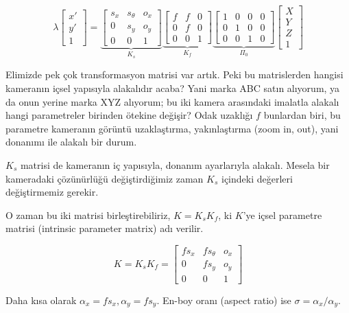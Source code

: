 \documentclass[12pt,fleqn]{article}\usepackage{../../common}
\begin{document}
$$ 
\lambda
\left[\begin{array}{c}
x' \\ y' \\ 1
\end{array}\right]
=
\underbrace{
\left[\begin{array}{rrr}
s_x & s_\theta & o_x \\
0 & s_y & o_y \\
0 & 0 & 1
\end{array}\right]
}_{K_s}
\underbrace{
\left[\begin{array}{rrr}
f & f & 0 \\
0 & f & 0 \\
0 & 0 & 1
\end{array}\right]}_{K_f}
\underbrace{
\left[\begin{array}{rrrr}
1 & 0 & 0 & 0\\
0 & 1 & 0 & 0\\
0 & 0 & 1 & 0
\end{array}\right]}_{\Pi_0}
\left[\begin{array}{r}
X \\ Y \\ Z \\ 1
\end{array}\right]
 $$

Elimizde pek çok transformasyon matrisi var artık. Peki bu matrislerden hangisi
kameranın içsel yapısıyla alakalıdır acaba? Yani marka ABC satın alıyorum, ya da
onun yerine marka XYZ alıyorum; bu iki kamera arasındaki imalatla alakalı hangi
parametreler birinden ötekine değişir? Odak uzaklığı $f$ bunlardan biri, bu
parametre kameranın görüntü uzaklaştırma, yakınlaştırma (zoom in, out), yani
donanımı ile alakalı bir durum.

$K_s$ matrisi de kameranın iç yapısıyla, donanım ayarlarıyla alakalı. Mesela bir
kameradaki çözünürlüğü değiştirdiğimiz zaman $K_s$ içindeki değerleri
değiştirmemiz gerekir.

O zaman bu iki matrisi birleştirebiliriz, $K = K_sK_f$, ki $K$'ye içsel parametre
matrisi (intrinsic parameter matrix) adı verilir.

$$ K = K_sK_f = \left[\begin{array}{rrr}
fs_x & fs_\theta & o_x \\
0 & fs_y & o_y \\
0 & 0 & 1
\end{array}\right] $$

Daha kısa olarak $\alpha_x = fs_x,\alpha_y=fs_y$. En-boy oranı (aspect
ratio) ise $\sigma = \alpha_x/\alpha_y$.
\end{document}
